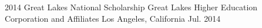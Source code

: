



\begin{cvhonors}

  \cvhonor
    {2014 Great Lakes National Scholarship} %
    {Great Lakes Higher Education Corporation and Affiliates} %
    {Los Angeles, California} %
    {Jul. 2014} %

\end{cvhonors}




